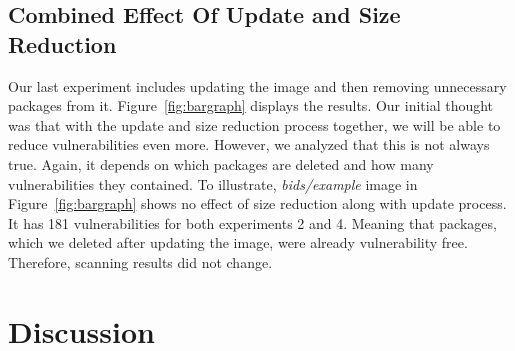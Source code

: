 \documentclass[a4paper,num-refs]{oup-contemporary}
\begin{document}
\subsection{Combined Effect Of Update and Size Reduction}

Our last experiment includes updating the image and then removing unnecessary packages from it.
Figure~\ref{fig:bargraph} displays the results. 
Our initial thought was that with the update and size reduction process together, we will be able to
reduce vulnerabilities even more. However,
we analyzed that this is not always true. Again, it depends on which packages are deleted and how
many vulnerabilities they contained. To illustrate, \textit{bids/example} image in Figure~\ref{fig:bargraph}
shows no effect of size reduction along with update process. It has 181 vulnerabilities for both experiments 2 and 4.
Meaning that packages, which we deleted after updating the image, were already vulnerability free. Therefore,
scanning results did not change.





\section{Discussion}
\end{document}
